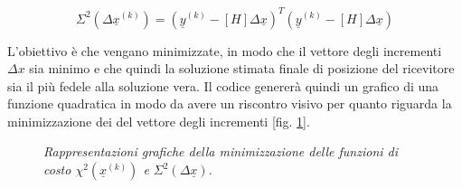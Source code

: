 \documentclass[a4paper,11pt,twoside]{book}
\begin{document}
\begin{enumerate}
	$$\Sigma^2(\Delta \underline{x}^{(k)}) = (\underline{y}^{(k)}-[H]\Delta \underline{x})^T (\underline{y}^{(k)}-[H]\Delta \underline{x})$$
	
	L'obiettivo è che vengano minimizzate, in modo che il vettore degli incrementi $\Delta x$ sia minimo e che quindi la soluzione stimata finale di posizione del ricevitore sia il più fedele alla soluzione vera. Il codice genererà quindi un grafico di una funzione quadratica in modo da avere un riscontro visivo per quanto riguarda la minimizzazione dei del vettore degli incrementi [fig. \ref{chiquad}].
	
	\begin{figure}[H]
		\centering
		\qquad
		\vspace{-0.3cm}
		\caption{\textit{Rappresentazioni grafiche della minimizzazione delle funzioni di costo $\chi^2 (\underline{x}^{(k)})$ e $\Sigma^2(\Delta \underline{x})$.}}
		\label{chiquad}
	\end{figure}


\end{enumerate}
\end{document}
